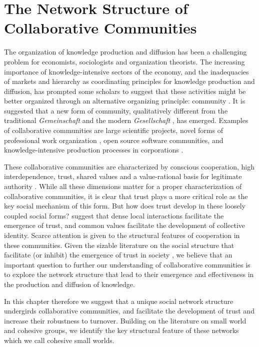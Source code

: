 \chapter{The Network Structure of Collaborative Communities}
\label{collaborative_communities}

The organization of knowledge production and diffusion has been a challenging problem for economists, sociologists and organization theorists. The increasing importance of knowledge-intensive sectors of the economy, and the inadequacies of markets and hierarchy as coordinating principles for knowledge production and diffusion, has prompted some scholars to suggest that these activities might be better organized through an alternative organizing principle: community \citep{adler:2001}. It is suggested that a new form of community, qualitatively different from the traditional \emph{Gemeinschaft} and the modern \emph{Gesellschaft} \citep{tonnies:1974}, has emerged.  Examples of collaborative communities are large scientific projects, novel forms of professional work organization \citep*{adler:2008}, open source software communities, and knowledge-intensive production processes in corporations \citep{adler:2006}.

These collaborative communities are characterized by conscious cooperation, high interdependence, trust, shared values and a value-rational basis for legitimate authority \citep{adler:2006,adler:2008}. While all these dimensions matter for a proper characterization of collaborative communities, it is clear that trust plays a more critical role as the key social mechanism of this form. But how does trust develop in these loosely coupled social forms? \citet{adler:2006} suggest that dense local interactions facilitate the emergence of trust, and common values facilitate the development of collective identity.  Scarce attention is given to the structural features of cooperation in these communities. Given the sizable literature on the social structure that facilitate (or inhibit) the emergence of trust in society \citep{granovetter:1985,coleman:1988,moody:2003}, we believe that an important question to further our understanding of collaborative communities is to explore the network structure that lead to their emergence and effectiveness in the production and diffusion of knowledge.

In this chapter therefore we suggest that a unique social network structure undergirds collaborative communities, and facilitate the development of trust and increase their robustness to turnover. Building on the literature on small world and cohesive groups, we identify the key structural feature of these networks which we call cohesive small worlds.

